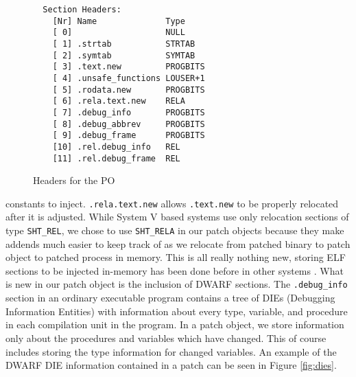 \begin{figure}[ht]
\begin{center}
\begin{verbatim}
  Section Headers:
    [Nr] Name              Type          
    [ 0]                   NULL          
    [ 1] .strtab           STRTAB        
    [ 2] .symtab           SYMTAB        
    [ 3] .text.new         PROGBITS      
    [ 4] .unsafe_functions LOUSER+1
    [ 5] .rodata.new       PROGBITS      
    [ 6] .rela.text.new    RELA          
    [ 7] .debug_info       PROGBITS      
    [ 8] .debug_abbrev     PROGBITS      
    [ 9] .debug_frame      PROGBITS      
    [10] .rel.debug_info   REL           
    [11] .rel.debug_frame  REL           
\end{verbatim}
\end{center}
\caption{Headers for the PO}
\label{fig:elfheaders}
\end{figure}
constants to inject. \texttt{.rela.text.new} allows \texttt{.text.new}
to be properly relocated after it is adjusted. While System V based
systems use only relocation sections of type \texttt{SHT\_REL}, we
chose to use \texttt{SHT\_RELA} in our patch objects because they make
addends much easier to keep track of as we relocate from patched
binary to patch object to patched process in memory. This is all
really nothing new, storing ELF sections to be injected in-memory has
been done before in other systems \cite{eresi}. What is new in our patch object is
the inclusion of DWARF sections. The \texttt{.debug\_info} section in
an ordinary executable program contains a tree of DIEs (Debugging
Information Entities) with information about every type, variable, and
procedure in each compilation unit in the program. In a patch object,
we store information only about the procedures and variables which
have changed. This of course includes storing the type information for
changed variables. An example of the DWARF DIE information contained
in a patch can be seen in Figure \ref{fig:dies}.


